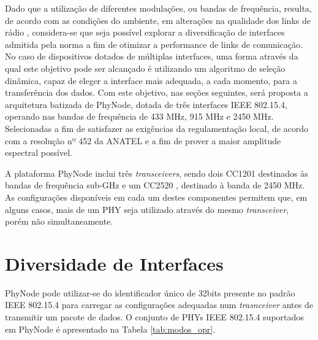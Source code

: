 \documentclass[
	12pt,				%
	openright,			%
	oneside,
	a4paper,			%
	english,			%
	french,				%
	spanish,			%
	brazil				%
	]{abntex2}
\begin{document}
Dado que a utilização de diferentes modulações, ou bandas de frequência, resulta, de acordo com as condições do ambiente, em alterações na qualidade dos links de rádio \cite{bibid}, considera-se que seja possível explorar a diversificação de interfaces admitida pela norma a fim de otimizar a performance de links de comunicação. No caso de dispositivos dotados de múltiplas interfaces, uma forma através da qual este objetivo pode ser alcançado é utilizando um algoritmo de seleção dinâmica, capaz de eleger a interface mais adequada, a cada momento, para a transferência dos dados. Com este objetivo, nas seções seguintes, será proposta a arquitetura batizada de PhyNode, dotada de três interfaces IEEE 802.15.4, operando nas bandas de frequência de 433 MHz, 915 MHz e 2450 MHz. Selecionadas a fim de satisfazer as exigências da regulamentação local, de acordo com a resolução nº 452 da ANATEL \cite{bibid} e a fim de prover a maior amplitude espectral possível.


A plataforma PhyNode inclui três \textit{transceivers}, sendo dois CC1201 \cite{bibid} destinados às bandas de frequência sub-GHz e um CC2520 \cite{bibid}, destinado à banda de 2450 MHz. As configurações disponíveis em cada um destes componentes permitem que, em alguns casos, mais de um PHY seja utilizado através do mesmo \textit{transceiver}, porém  não simultaneamente.
	\section{Diversidade de Interfaces}
	PhyNode pode utilizar-se do identificador único de 32bits presente no padrão IEEE 802.15.4 para carregar as configurações adequadas num \textit{trasnceiver} antes de transmitir um pacote de dados. O conjunto de PHYs IEEE 802.15.4 suportados em PhyNode é apresentado na Tabela \ref{tab:modos_opr}.
	
\end{document}
